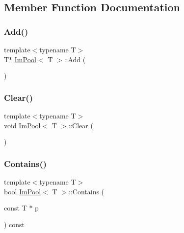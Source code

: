 \subsection{Member Function Documentation}
\mbox{\label{structImPool_a10328df7e17eb5ab4b91c25ad3b0db4f}} 
\subsubsection{\texorpdfstring{Add()}{Add()}}
{\footnotesize\ttfamily template$<$typename T$>$ \\
T$\ast$ \hyperlink{structImPool}{Im\+Pool}$<$ T $>$\+::Add (\begin{DoxyParamCaption}{ }\end{DoxyParamCaption})\hspace{0.3cm}{\ttfamily [inline]}}

\mbox{\label{structImPool_a613b0fa43ad7457ebde2988d4ea5f0be}} 
\subsubsection{\texorpdfstring{Clear()}{Clear()}}
{\footnotesize\ttfamily template$<$typename T$>$ \\
\hyperlink{imgui__impl__opengl3__loader_8h_ac668e7cffd9e2e9cfee428b9b2f34fa7}{void} \hyperlink{structImPool}{Im\+Pool}$<$ T $>$\+::Clear (\begin{DoxyParamCaption}{ }\end{DoxyParamCaption})\hspace{0.3cm}{\ttfamily [inline]}}

\mbox{\label{structImPool_a2434a4efa2eab4aeca8e15ac208c18d8}} 
\subsubsection{\texorpdfstring{Contains()}{Contains()}}
{\footnotesize\ttfamily template$<$typename T$>$ \\
bool \hyperlink{structImPool}{Im\+Pool}$<$ T $>$\+::Contains (\begin{DoxyParamCaption}\item[{const T $\ast$}]{p }\end{DoxyParamCaption}) const\hspace{0.3cm}{\ttfamily [inline]}}

